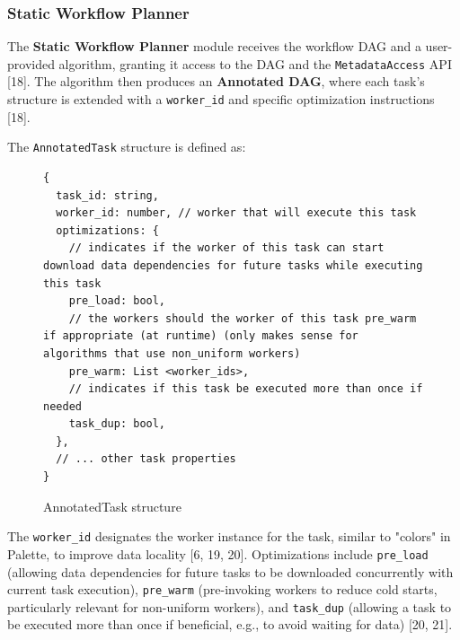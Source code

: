 \documentclass[conference]{IEEEtran}
\begin{document}
\subsubsection{Static Workflow Planner}
The \textbf{Static Workflow Planner} module receives the workflow DAG and a user-provided algorithm, granting it access to the DAG and the \texttt{MetadataAccess} API [18]. The algorithm then produces an \textbf{Annotated DAG}, where each task's structure is extended with a \texttt{worker\_id} and specific optimization instructions [18].

The \texttt{AnnotatedTask} structure is defined as:
\begin{figure}[h]
\centering
\begin{lstlisting}[basicstyle=\ttfamily\footnotesize, columns=fullflexible, breaklines=true]
{
  task_id: string,
  worker_id: number, // worker that will execute this task
  optimizations: {
    // indicates if the worker of this task can start download data dependencies for future tasks while executing this task
    pre_load: bool,
    // the workers should the worker of this task pre_warm if appropriate (at runtime) (only makes sense for algorithms that use non_uniform workers)
    pre_warm: List <worker_ids>,
    // indicates if this task be executed more than once if needed
    task_dup: bool,
  },
  // ... other task properties
}
\end{lstlisting}
\caption{AnnotatedTask structure}
\label{lst:annotated_task}
\end{figure}

The \texttt{worker\_id} designates the worker instance for the task, similar to "colors" in Palette, to improve data locality [6, 19, 20]. Optimizations include \texttt{pre\_load} (allowing data dependencies for future tasks to be downloaded concurrently with current task execution), \texttt{pre\_warm} (pre-invoking workers to reduce cold starts, particularly relevant for non-uniform workers), and \texttt{task\_dup} (allowing a task to be executed more than once if beneficial, e.g., to avoid waiting for data) [20, 21].
\end{document}
